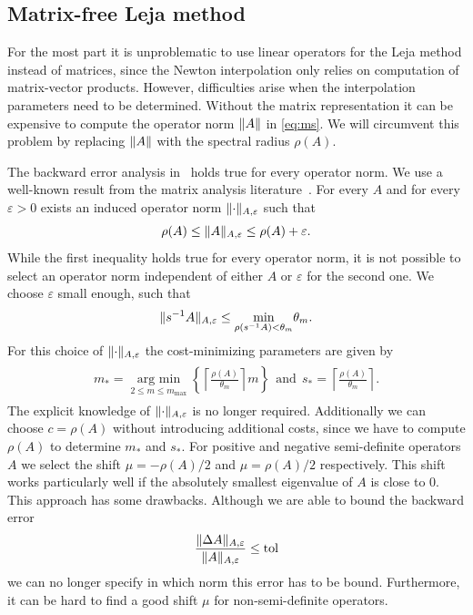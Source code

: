 \documentclass{scrartcl}
\begin{document}
	\subsection{Matrix-free Leja method} \label{sec:MatrixFreeLejaMethod}
	For the most part it is unproblematic to use linear operators for the Leja method instead of matrices, since the Newton interpolation only relies on computation of matrix-vector products. However, difficulties arise when the interpolation parameters need to be determined. Without the matrix representation it can be expensive to compute the operator norm $\lVert A\rVert$ in \eqref{eq:ms}. We will circumvent this problem by replacing $\lVert A\rVert$ with the spectral radius $\rho(A)$. 
	
	The backward error analysis in~\cite{lejarev} holds true for every operator norm.
	We use a well-known result from the matrix analysis literature~\cite[Lemma 5.6.10.]{matrixanalysis}. For every $A$ and for every $\varepsilon>0$ exists an induced operator norm $\lVert\cdot\rVert_{A,\varepsilon}$ such that
	\[
	\rho(A) \le \lVert A\rVert_{A,\varepsilon} \le \rho(A) + \varepsilon. 
	\]
	While the first inequality holds true for every operator norm, it is not possible to select an operator norm independent of either $A$ or $\varepsilon$ for the second one. We choose $\varepsilon$ small enough, such that
	\[
	\lVert s^{-1}A\rVert_{A,\varepsilon} \le \underset{\rho(s^{-1}A) < \theta_m}{\min}\theta_m.
	\]
	For this choice of $\lVert\cdot\rVert_{A,\varepsilon}$ the cost-minimizing parameters are given by
	\begin{align}
	\begin{split}
	m_* = \underset{2\le m\le m_{\operatorname{max}}}{\operatorname{arg\ min}}  \left\{{\left\lceil{\frac{\rho(A)}{\theta_m}}\right\rceil}m\right\} ~~\text{and}~~
	s_* =  \left\lceil{\frac{\rho(A)}{\theta_m}}\right\rceil.
	\end{split}\label{eq:msmatrixfree}
	\end{align}
	The explicit knowledge of $\lVert\cdot\rVert_{A,\varepsilon}$ is no longer required. Additionally we can choose $c=\rho(A)$ without introducing additional costs, since we have to compute $\rho(A)$ to determine $m_*$ and $s_*$. 
	For positive and negative semi-definite operators $A$ we select the shift $\mu = -\rho(A)/2$ and $\mu = \rho(A)/2$ respectively. This shift works particularly well if the absolutely smallest eigenvalue of $A$ is close to $0$.\\
	This approach has some drawbacks. Although we are able to bound the backward error
	\[
	\frac{\lVert\Delta A\rVert_{A,\varepsilon}}{\lVert A\rVert_{A,\varepsilon}} \le \operatorname{tol}  
	\]
	we can no longer specify in which norm this error has to be bound. Furthermore, it can be hard to find a good shift $\mu$ for non-semi-definite operators.
\end{document}
